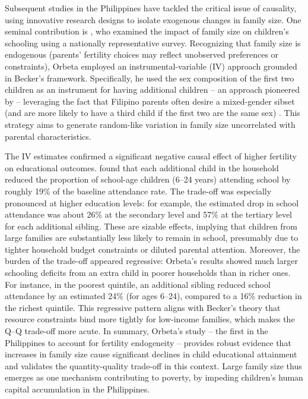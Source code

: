 \documentclass[]{AEA}
\begin{document}
Subsequent studies in the Philippines have tackled the critical issue of
causality, using innovative research designs to isolate exogenous
changes in family size. One seminal contribution is
\citet{orbeta2010number}, who examined the impact of family size on
children's schooling using a nationally representative survey.
Recognizing that family size is endogenous (parents' fertility choices
may reflect unobserved preferences or constraints), Orbeta employed an
instrumental-variable (IV) approach grounded in Becker's framework.
Specifically, he used the sex composition of the first two children as
an instrument for having additional children -- an approach pioneered by
\citet{angrist1996children} -- leveraging the fact that Filipino parents
often desire a mixed-gender sibset (and are more likely to have a third
child if the first two are the same sex) \citep{vicerra2013fertility}.
This strategy aims to generate random-like variation in family size
uncorrelated with parental characteristics.

The IV estimates confirmed a significant negative causal effect of
higher fertility on educational outcomes. \citet{orbeta2010number} found
that each additional child in the household reduced the proportion of
school-age children (6--24 years) attending school by roughly 19\% of
the baseline attendance rate. The trade-off was especially pronounced at
higher education levels: for example, the estimated drop in school
attendance was about 26\% at the secondary level and 57\% at the
tertiary level for each additional sibling. These are sizable effects,
implying that children from large families are substantially less likely
to remain in school, presumably due to tighter household budget
constraints or diluted parental attention. Moreover, the burden of the
trade-off appeared regressive: Orbeta's results showed much larger
schooling deficits from an extra child in poorer households than in
richer ones. For instance, in the poorest quintile, an additional
sibling reduced school attendance by an estimated 24\% (for ages 6--24),
compared to a 16\% reduction in the richest quintile. This regressive
pattern aligns with Becker's theory that resource constraints bind more
tightly for low-income families, which makes the Q--Q trade-off more
acute. In summary, Orbeta's study -- the first in the Philippines to
account for fertility endogeneity -- provides robust evidence that
increases in family size cause significant declines in child educational
attainment and validates the quantity-quality trade-off in this context.
Large family size thus emerges as one mechanism contributing to poverty,
by impeding children's human capital accumulation in the Philippines.
\end{document}
